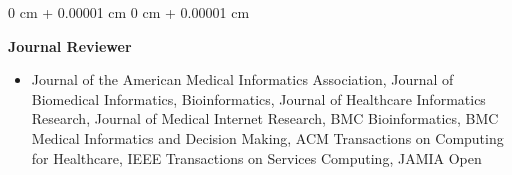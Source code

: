 \documentclass[10pt, letterpaper]{article}
\newenvironment{highlights}{
    \begin{itemize}[
        topsep=0.10 cm,
        parsep=0.10 cm,
        partopsep=0pt,
        itemsep=0pt,
        leftmargin=0 cm + 10pt
    ]
}{
    \end{itemize}
} %
\newenvironment{onecolentry}{
    \begin{adjustwidth}{
        0 cm + 0.00001 cm
    }{
        0 cm + 0.00001 cm
    }
}{
    \end{adjustwidth}
} %
\begin{document}
    \vspace{0.2 cm}

    \begin{onecolentry}
    \textbf{Journal Reviewer}
    \begin{highlights}
    \item Journal of the American Medical Informatics Association, Journal of Biomedical Informatics, Bioinformatics, Journal of Healthcare Informatics Research, Journal of Medical Internet Research, BMC Bioinformatics, BMC Medical Informatics and Decision Making, ACM Transactions on Computing for Healthcare, IEEE Transactions on Services Computing, JAMIA Open
    \end{highlights}
    \end{onecolentry}
    





    
\end{document}
